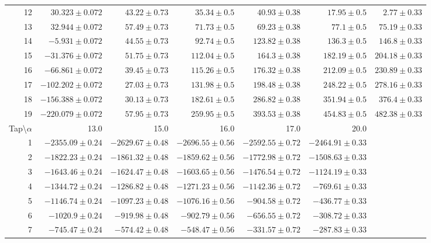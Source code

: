 \documentclass[runningheads]{llncs}
\begin{document}
\begin{table}
\begin{center}
\begin{tabular}{rrrrrrr}
12 &    $30.323\pm0.072$ &    $43.22\pm0.73$ &    $35.34\pm0.5$ &     $40.93\pm0.38$ &     $17.95\pm0.5$ &      $2.77\pm0.33$ \\
13 &    $32.944\pm0.072$ &    $57.49\pm0.73$ &    $71.73\pm0.5$ &     $69.23\pm0.38$ &      $77.1\pm0.5$ &     $75.19\pm0.33$ \\
14 &    $-5.931\pm0.072$ &    $44.55\pm0.73$ &    $92.74\pm0.5$ &    $123.82\pm0.38$ &     $136.3\pm0.5$ &     $146.8\pm0.33$ \\
15 &   $-31.376\pm0.072$ &    $51.75\pm0.73$ &   $112.04\pm0.5$ &     $164.3\pm0.38$ &    $182.19\pm0.5$ &    $204.18\pm0.33$ \\
16 &   $-66.861\pm0.072$ &    $39.45\pm0.73$ &   $115.26\pm0.5$ &    $176.32\pm0.38$ &    $212.09\pm0.5$ &    $230.89\pm0.33$ \\
17 &   $-102.202\pm0.072$ &    $27.03\pm0.73$ &   $131.98\pm0.5$ &    $198.48\pm0.38$ &    $248.22\pm0.5$ &    $278.16\pm0.33$ \\
18 &  $-156.388\pm0.072$ &    $30.13\pm0.73$ &   $182.61\pm0.5$ &    $286.82\pm0.38$ &    $351.94\pm0.5$ &     $376.4\pm0.33$ \\
19 &  $-220.079\pm0.072$ &    $57.95\pm0.73$ &   $259.95\pm0.5$ &    $393.53\pm0.38$ &    $454.83\pm0.5$ &    $482.38\pm0.33$ \\
\bottomrule
\toprule
{}Tap\textbackslash$\alpha$ &               13.0 &               15.0 &               16.0 &               17.0 &       
        20.0 \\
\midrule
1  &   $-2355.09\pm0.24$ &  $-2629.67\pm0.48$ &  $-2696.55\pm0.56$ &  $-2592.55\pm0.72$ &  $-2464.91\pm0.33$ \\
2  &   $-1822.23\pm0.24$ &  $-1861.32\pm0.48$ &  $-1859.62\pm0.56$ &  $-1772.98\pm0.72$ &  $-1508.63\pm0.33$ \\
3  &   $-1643.46\pm0.24$ &  $-1624.47\pm0.48$ &  $-1603.65\pm0.56$ &  $-1476.54\pm0.72$ &  $-1124.19\pm0.33$ \\
4  &   $-1344.72\pm0.24$ &  $-1286.82\pm0.48$ &  $-1271.23\pm0.56$ &  $-1142.36\pm0.72$ &   $-769.61\pm0.33$ \\
5  &   $-1146.74\pm0.24$ &  $-1097.23\pm0.48$ &  $-1076.16\pm0.56$ &   $-904.58\pm0.72$ &   $-436.77\pm0.33$ \\
6  &    $-1020.9\pm0.24$ &   $-919.98\pm0.48$ &   $-902.79\pm0.56$ &   $-656.55\pm0.72$ &   $-308.72\pm0.33$ \\
7  &    $-745.47\pm0.24$ &   $-574.42\pm0.48$ &   $-548.47\pm0.56$ &   $-331.57\pm0.72$ &   $-287.83\pm0.33$ \\

\end{tabular}
\end{center}
\end{table}
\end{document}
